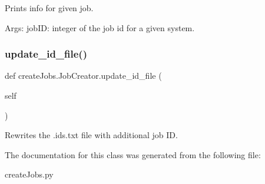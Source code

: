 \begin{DoxyVerb}Prints info for given job.

Args:
    jobID: integer of the job id for a given system.
\end{DoxyVerb}
 \mbox{\label{classcreate_jobs_1_1_job_creator_a6c2d2cf3102c800e5bdb17d7dc866e0c}} 
\subsubsection{\texorpdfstring{update\_id\_file()}{update\_id\_file()}}
{\footnotesize\ttfamily def create\+Jobs.\+Job\+Creator.\+update\+\_\+id\+\_\+file (\begin{DoxyParamCaption}\item[{}]{self }\end{DoxyParamCaption})}

\begin{DoxyVerb}Rewrites the .ids.txt file with additional job ID.\end{DoxyVerb}
 

The documentation for this class was generated from the following file\+:\begin{DoxyCompactItemize}
\item 
create\+Jobs.\+py\end{DoxyCompactItemize}
